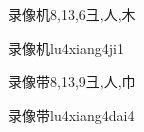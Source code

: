 \begin{Entry}{录像机}{8,13,6}{⼹,⼈,⽊}
  \begin{Phonetics}{录像机}{lu4xiang4ji1}
  \end{Phonetics}
\end{Entry}

\begin{Entry}{录像带}{8,13,9}{⼹,⼈,⼱}
  \begin{Phonetics}{录像带}{lu4xiang4dai4}
  \end{Phonetics}
\end{Entry}



